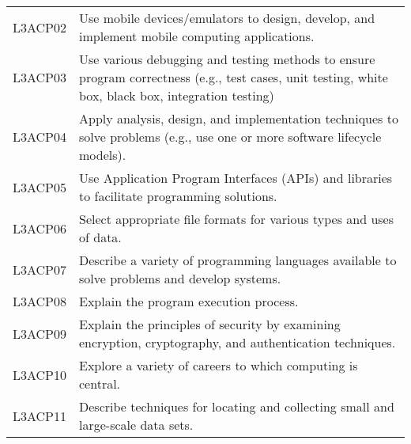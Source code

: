 \begin{longtable}{p{1.8cm}p{11cm}}
 L3ACP02 & Use mobile devices/emulators to design, develop, and implement mobile computing applications.                                                                                                                              \\
 L3ACP03 & Use various debugging and testing methods to ensure program correctness (e.g., test cases, unit testing, white box, black box, integration testing)                                                                        \\
 L3ACP04 & Apply analysis, design, and implementation techniques to solve problems (e.g., use one or more software lifecycle models).                                                                                                 \\
 L3ACP05 & Use Application Program Interfaces (APIs) and libraries to facilitate programming solutions.                                                                                                                               \\
 L3ACP06 & Select appropriate file formats for various types and uses of data.                                                                                                                                                        \\
 L3ACP07 & Describe a variety of programming languages available to solve problems and develop systems.                                                                                                                               \\
 L3ACP08 & Explain the program execution process.                                                                                                                                                                                     \\
 L3ACP09 & Explain the principles of security by examining encryption, cryptography, and authentication techniques.                                                                                                                   \\
 L3ACP10 & Explore a variety of careers to which computing is central.                                                                                                                                                                \\
 L3ACP11 & Describe techniques for locating and collecting small and large-scale data sets.                                                                                                                                           \\

\end{longtable}

